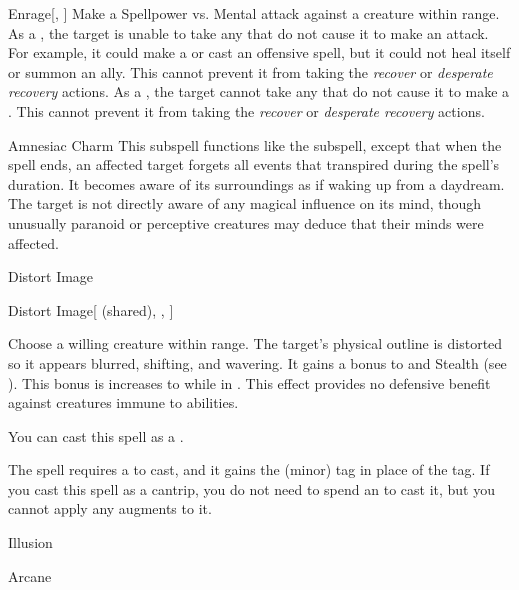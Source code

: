 \begin{ability}[\nth{4}]{Enrage}[, ]
Make a Spellpower vs. Mental attack against a creature within \rngmed range.
\hit As a , the target is unable to take any  that do not cause it to make an attack.
For example, it could make a  or cast an offensive spell, but it could not heal itself or summon an ally.
This cannot prevent it from taking the \textit{recover} or \textit{desperate recovery} actions.
\crit As a , the target cannot take any  that do not cause it to make a .
This cannot prevent it from taking the \textit{recover} or \textit{desperate recovery} actions.
\end{ability}
\vspace{0.25em}


\begin{ability}[\nth{7}]{Amnesiac Charm}
This subspell functions like the  subspell, except that when the spell ends, an affected target forgets all events that transpired during the spell's duration.
It becomes aware of its surroundings as if waking up from a daydream.
The target is not directly aware of any magical influence on its mind, though unusually paranoid or perceptive creatures may deduce that their minds were affected.
\end{ability}
\vspace{0.25em}

\newpage
\begin{spellsection}{Distort Image}


\begin{ability}{Distort Image}[ (shared), , ]

Choose a willing creature within \rngmed range.
The target's physical outline is distorted so it appears blurred, shifting, and wavering.
It gains a  bonus to  and Stealth (see ).
This bonus is increases to  while in .
This effect provides no defensive benefit against creatures immune to  abilities.

You can cast this spell as a .

\end{ability}



 The spell requires a  to cast, and it gains the  (minor) tag in place of the  tag. If you cast this spell as a cantrip,
you do not need to spend an  to cast it,
but you cannot apply any augments to it.


 Illusion

 Arcane
\end{spellsection}


